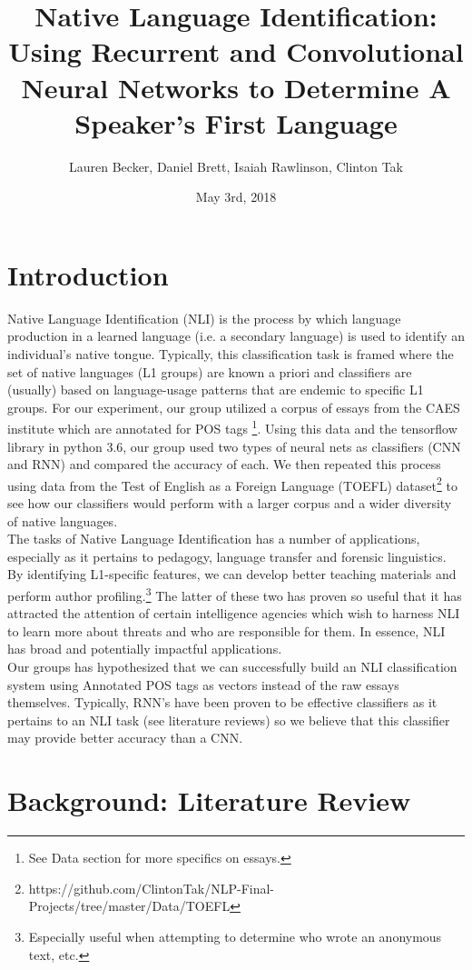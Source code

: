 \documentclass[12pt]{article}
\title{Native Language Identification: Using Recurrent and Convolutional Neural Networks to Determine A Speaker's First Language}
\author{Lauren Becker, Daniel Brett, Isaiah Rawlinson, Clinton Tak}
\date{May 3rd, 2018}
\newcommand\tab[1][1cm]{\hspace*{#1}}
\begin{document}
	\maketitle
\newpage
\tableofcontents
\newpage
\section{Introduction}
\tab Native Language Identification (NLI) is the process by which language production in a learned language (i.e. a secondary language) is used to identify an individual's native tongue. Typically, this classification task is framed where the set of native languages (L1 groups) are known a priori and classifiers are (usually) based on language-usage patterns that are endemic to specific L1 groups. For our experiment, our group utilized a corpus of essays from the CAES institute which are annotated for POS tags \footnote{See Data section for more specifics on essays.}. Using this data and the tensorflow library in python 3.6, our group used two types of neural nets as classifiers (CNN and RNN) and compared the accuracy of each. We then repeated this process using data from the Test of English as a Foreign Language (TOEFL) dataset\footnote{https://github.com/ClintonTak/NLP-Final-Projects/tree/master/Data/TOEFL} to see how our classifiers would perform with a larger corpus and a wider diversity of native languages.\\
\tab The tasks of Native Language Identification has a number of applications, especially as it pertains to pedagogy, language transfer and forensic linguistics. By identifying L1-specific features, we can develop better teaching materials and perform author profiling.\footnote{Especially useful when attempting to determine who wrote an anonymous text, etc.} The latter of these two has proven so useful that it has attracted the attention of certain intelligence agencies which wish to harness NLI to learn more about threats and who are responsible for them. In essence, NLI has broad and potentially impactful applications.\\
\tab Our groups has hypothesized that we can successfully build an NLI classification system using Annotated POS tags as vectors instead of the raw essays themselves. Typically, RNN's have been proven to be effective classifiers as it pertains to an NLI task (see literature reviews) so we believe that this classifier may provide better accuracy than a CNN.
\section{Background: Literature Review}
\end{document}
